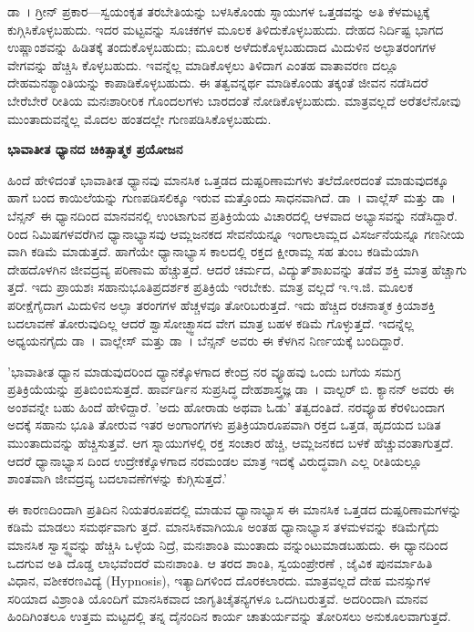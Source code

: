 ಡಾ~। ಗ್ರೀನ್ ಪ್ರಕಾರ—ಸ್ವಯಂಕೃತ ತರಬೇತಿಯನ್ನು ಬಳಸಿಕೊಂಡು  ಸ್ನಾಯುಗಳ ಒತ್ತಡವನ್ನು ಅತಿ ಕೆಳಮಟ್ಟಕ್ಕೆ ಕುಗ್ಗಿಸಿಕೊಳ್ಳಬಹುದು. ಇದರ ಮಟ್ಟವನ್ನು  ಸೂಚಕಗಳ ಮೂಲಕ ತಿಳಿದುಕೊಳ್ಳಬಹುದು.  ದೇಹದ ನಿರ್ದಿಷ್ಟ ಭಾಗದ ಉಷ್ಣಾಂಶವನ್ನು ಹಿಡಿತಕ್ಕೆ ತಂದುಕೊಳ್ಳಬಹುದು;  ಮೂಲಕ ಅಳೆದುಕೊಳ್ಳಬಹುದಾದ ಮಿದುಳಿನ ಅಲ್ಫಾತರಂಗಗಳ ವೇಗವನ್ನು ಹೆಚ್ಚಿಸಿ ಕೊಳ್ಳಬಹುದು.  ಇವನ್ನೆಲ್ಲ ಮಾಡಿಕೊಳ್ಳಲು ತಿಳಿದಾಗ ಎಂತಹ ವಾತಾವರಣ ದಲ್ಲೂ ದೇಹಮನಶ್ಯಾಂತಿಯನ್ನು ಕಾಪಾಡಿಕೊಳ್ಳಬಹುದು. ಈ ತತ್ವವನ್ನರ್ಥ ಮಾಡಿಕೊಂಡು ತಕ್ಕಂತೆ ಜೀವನ ನಡೆಸಿದರೆ ಬೇರೆಬೇರೆ ರೀತಿಯ ಮನಃಶಾರೀರಿಕ ಗೊಂದಲಗಳು ಬಾರದಂತೆ ನೋಡಿಕೊಳ್ಳಬಹುದು. ಮಾತ್ರವಲ್ಲದೆ ಅರೆತಲೆನೋವು ಮುಂತಾದುವನ್ನೆಲ್ಲ ಮೊದಲ ಹಂತದಲ್ಲೇ ಗುಣಪಡಿಸಿಕೊಳ್ಳಬಹುದು.

\textbf{ಭಾವಾತೀತ ಧ್ಯಾನದ ಚಿಕಿತ್ಸಾತ್ಮಕ ಪ್ರಯೋಜನ}\\

ಹಿಂದೆ ಹೇಳಿದಂತೆ ಭಾವಾತೀತ ಧ್ಯಾನವು ಮಾನಸಿಕ ಒತ್ತಡದ ದುಷ್ಪರಿಣಾಮಗಳು ತಲೆದೋರದಂತೆ ಮಾಡುವುದಕ್ಕೂ ಹಾಗೆ ಬಂದ ಕಾಯಿಲೆಯನ್ನು ಗುಣಪಡಿಸಲಿಕ್ಕೂ ಇರುವ ಮತ್ತೊಂದು ಸಾಧನವಾಗಿದೆ. ಡಾ~। ವಾಲ್ಲೆಸ್ ಮತ್ತು ಡಾ~। ಬೆನ್ಸನ್ ಈ ಧ್ಯಾನದಿಂದ ಮಾನವನಲ್ಲಿ ಉಂಟಾಗುವ ಪ್ರತಿಕ್ರಿಯೆಯ ವಿಚಾರದಲ್ಲಿ ಆಳವಾದ ಅಭ್ಯಾಸವನ್ನು ನಡೆಸಿದ್ದಾರೆ.  ರಿಂದ  ನಿಮಿಷಗಳವರೆಗಿನ ಧ್ಯಾನಾಭ್ಯಾಸವು ಆಮ್ಲಜನಕದ ಸೇವನೆಯನ್ನೂ ಇಂಗಾಲಾಮ್ಲದ ವಿಸರ್ಜನೆಯನ್ನೂ ಗಣನೀಯ ವಾಗಿ ಕಡಿಮೆ ಮಾಡುತ್ತದೆ. ಹಾಗೆಯೇ ಧ್ಯಾನಾಭ್ಯಾಸ ಕಾಲದಲ್ಲಿ ರಕ್ತದ ಕ್ಷೀರಾಮ್ಲ  ಸಹ ತುಂಬ ಕಡಿಮೆಯಾಗಿ ದೇಹದೊಳಗಿನ ಜೀವದ್ರವ್ಯ ಪರಿಣಾಮ ಹೆಚ್ಚುತ್ತದೆ. ಆದರೆ ಚರ್ಮದ, ವಿದ್ಯುತ್​ಶಾಖವನ್ನು ತಡೆವ ಶಕ್ತಿ ಮಾತ್ರ ಹೆಚ್ಚಾಗು ತ್ತದೆ. ಇದು ಪ್ರಾಯಶಃ ಸಹಾನುಭೂತಿಪ್ರದರ್ಶಕ ಪ್ರತಿಕ್ರಿಯೆ ಇರಬೇಕು. ಮಾತ್ರ ವಲ್ಲದೆ ಇ.ಇ.ಜಿ. ಮೂಲಕ ಪರೀಕ್ಷೆಗೈದಾಗ ಮಿದುಳಿನ ಅಲ್ಫಾ ತರಂಗಗಳ ಹೆಚ್ಚಳವೂ ತೋರಿಬರುತ್ತದೆ. ಇದು ಹೆಚ್ಚಿದ ರಚನಾತ್ಮಕ ಕ್ರಿಯಾಶಕ್ತಿ ಬದಲಾವಣೆ ತೋರುವುದಿಲ್ಲ ಆದರೆ ಶ್ವಾಸೋಚ್ಛ್ವಾಸದ ವೇಗ ಮಾತ್ರ ಬಹಳ ಕಡಿಮೆ ಗೊಳ್ಳುತ್ತದೆ. ಇದನ್ನೆಲ್ಲ ಅಧ್ಯಯನಗೈದು ಡಾ~। ವಾಲ್ಲೇಸ್ ಮತ್ತು ಡಾ~। ಬೆನ್ಸನ್ ಅವರು ಈ ಕೆಳಗಿನ ನಿರ್ಣಯಕ್ಕೆ ಬಂದಿದ್ದಾರೆ.

'ಭಾವಾತೀತ ಧ್ಯಾನ ಮಾಡುವುದರಿಂದ ಧ್ಯಾನಕ್ಕೊಳಗಾದ ಕೇಂದ್ರ ನರ ವ್ಯೂಹವು ಒಂದು ಬಗೆಯ ಸಮಗ್ರ ಪ್ರತಿಕ್ರಿಯೆಯನ್ನು ಪ್ರತಿಬಿಂಬಿಸುತ್ತದೆ. ಹಾರ್ವರ್ಡಿನ ಸುಪ್ರಸಿದ್ಧ ದೇಹಶಾಸ್ತ್ರಜ್ಞ ಡಾ~। ವಾಲ್ಟರ್ ಬಿ. ಕ್ಯಾನನ್ ಅವರು ಈ ಅಂಶವನ್ನೇ ಬಹು ಹಿಂದೆ ಹೇಳಿದ್ದಾರೆ. 'ಅದು ಹೋರಾಡು ಅಥವಾ ಓಡು'  ತತ್ವದಂತಿದೆ. ನರವ್ಯೂಹ ಕೆರಳಿಬಂದಾಗ ಅದಕ್ಕೆ ಸಹಾನು ಭೂತಿ ತೋರುವ ಇತರ ಅಂಗಾಂಗಗಳು ಪ್ರತಿಕ್ರಿಯಾರೂಪವಾಗಿ ರಕ್ತದ ಒತ್ತಡ, ಹೃದಯದ ಬಡಿತ ಮುಂತಾದುವನ್ನು ಹೆಚ್ಚಿಸುತ್ತವೆ. ಆಗ ಸ್ನಾಯುಗಳಲ್ಲಿ ರಕ್ತ ಸಂಚಾರ ಹೆಚ್ಚಿ, ಆಮ್ಲಜನಕದ ಬಳಕೆ ಹೆಚ್ಚುವಂತಾಗುತ್ತದೆ. ಆದರೆ ಧ್ಯಾನಾಭ್ಯಾಸ ದಿಂದ ಉದ್ರೇಕಕ್ಕೊಳಗಾದ ನರಮಂಡಲ ಮಾತ್ರ ಇದಕ್ಕೆ ವಿರುದ್ಧವಾಗಿ ಎಲ್ಲ ರೀತಿಯಲ್ಲೂ ಶಾಂತವಾಗಿ ಜೀವದ್ರವ್ಯ ಬದಲಾವಣೆಗಳನ್ನು ಕುಗ್ಗಿಸುತ್ತದೆ.'

ಈ ಕಾರಣದಿಂದಾಗಿ ಪ್ರತಿದಿನ ನಿಯತರೂಪದಲ್ಲಿ ಮಾಡುವ ಧ್ಯಾನಾಭ್ಯಾಸ ಈ ಮಾನಸಿಕ ಒತ್ತಡದ ದುಷ್ಪರಿಣಾಮಗಳನ್ನು ಕಡಿಮೆ ಮಾಡಲು ಸಮರ್ಥವಾಗು ತ್ತದೆ. ಮಾನಸಿಕವಾಗಿಯೂ ಅಂತಹ ಧ್ಯಾನಾಭ್ಯಾಸ ತಳಮಳವನ್ನು ಕಡಿಮೆಗೈದು ಮಾನಸಿಕ ಸ್ವಾಸ್ಥ್ಯವನ್ನು ಹೆಚ್ಚಿಸಿ ಒಳ್ಳೆಯ ನಿದ್ರೆ, ಮನಃಶಾಂತಿ ಮುಂತಾದು ವನ್ನುಂಟುಮಾಡಬಹುದು. ಈ ಧ್ಯಾನದಿಂದ ಒದಗುವ ಅತಿ ದೊಡ್ಡ ಲಾಭವೆಂದರೆ ಮನಃಶಾಂತಿ. ಆ ತರದ ಶಾಂತಿ, ಸ್ವಯಂಪ್ರೇರಣೆ , ಜೈವಿಕ ಪುನರ್ಮಾಹಿತಿ ವಿಧಾನ, ವಶೀಕರಣವಿದ್ಯೆ (Hypnosis), ಇತ್ಯಾದಿಗಳಿಂದ ದೊರಕಲಾರದು. ಮಾತ್ರವಲ್ಲದೆ ದೇಹ ಮನಸ್ಸುಗಳ ಸರಿಯಾದ ವಿಶ್ರಾಂತಿ ಯೊಂದಿಗೆ ಮಾನಸಿಕವಾದ ಜಾಗೃತಿಚೈತನ್ಯಗಳೂ ಒದಗಿಬರುತ್ತವೆ. ಅದರಿಂದಾಗಿ ಮಾನವ ಹಿಂದಿಗಿಂತಲೂ ಉತ್ತಮ ಮಟ್ಟದಲ್ಲಿ ತನ್ನ ದೈನಂದಿನ ಕಾರ್ಯ ಚಾತುರ್ಯವನ್ನು ತೋರಿಸಲು ಅನುಕೂಲವಾಗುತ್ತದೆ.

